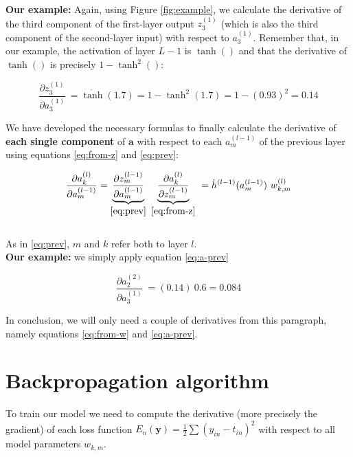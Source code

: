 \documentclass{article}
\begin{document}
\textbf{Our example:} Again, using Figure \ref{fig:example}, we calculate the derivative of the third component of the first-layer output $z_{3}^{( 1)}$ (which is also the third component of the second-layer input) with respect to $a_{3}^{( 1)}$. Remember that, in our example, the activation of layer $L-1$ is $\tanh()$ and that the derivative of $\tanh()$ is precisely $1-\tanh^2()$:

\begin{equation*}
\frac{\partial z_{3}^{( 1)}}{\partial a_{3}^{( 1)}} \ =\dot{\tanh}( 1.7) =1-\tanh^{2}( 1.7) =1-( 0.93)^{2}=0.14
\end{equation*}

\begin{center}\textleaf\end{center}


We have developed the necessary formulas to finally calculate the derivative of \textbf{each single component} of $\boldsymbol{a}$ with respect to each $a_m^{(l-1)}$ of the previous layer using equations \eqref{eq:from-z} and \eqref{eq:prev}:

\begin{gather}
\frac{\partial a_{k}^{(l)} }{ \partial a_{m}^{( l-1)}}
= \underbrace{\frac{\partial z_{m}^{( l-1)}}{\partial a_{m}^{( l-1)}}}_{\eqref{eq:prev}} \
\underbrace{\frac{\partial a_{k}^{( l)}}{\partial z_{m}^{( l-1)}}}_{\eqref{eq:from-z}} \
=\dot{h}^{( l-1)}( a_{m}^{( l-1)}) \ w_{k,m}^{( l)} \label{eq:a-prev}
\end{gather}\\

As in \eqref{eq:prev}, $m$ and $k$ refer both to layer $l$.\\

\textbf{Our example:} we simply apply equation \eqref{eq:a-prev}


\begin{equation*}
\frac{\partial a_{2}^{( 2)}}{\partial a_{3}^{( 1)}} \  = (0.14)\ 0.6 = 0.084
\end{equation*}

In conclusion, we will only need a couple of derivatives from this paragraph, namely equations \eqref{eq:from-w} and \eqref{eq:a-prev}.

\section{Backpropagation algorithm}
To train our model we need to compute the derivative (more precisely the gradient) of each loss function $\displaystyle E_{n}(\mathbf{y}) =\frac{1}{2}\sum ( y_{in} -t_{in})^{2}$ with respect to all model parameters $w_{k,m}$.
\end{document}
